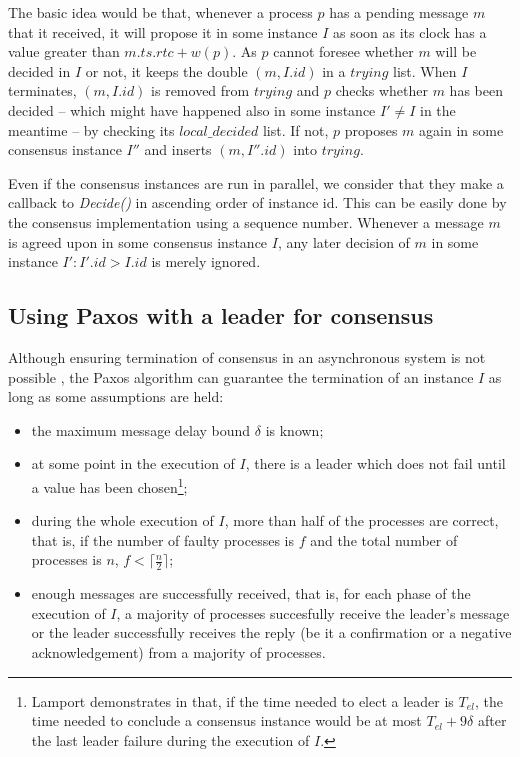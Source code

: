\documentclass[times, 10pt]{article}
\begin{document}
The basic idea would be that, whenever a process $p$ has a pending message $m$ that it received, it will propose it in some instance $I$ as soon as its clock has a value greater than $m.ts.rtc + w(p)$. As $p$ cannot foresee whether $m$ will be decided in $I$ or not, it keeps the double $(m,I.id)$ in a $trying$ list. When $I$ terminates, $(m,I.id)$ is removed from $trying$ and $p$ checks whether $m$ has been decided -- which might have happened also in some instance $I' \neq I$ in the meantime -- by checking its $local\_decided$ list. If not, $p$ proposes $m$ again in some consensus instance $I''$ and inserts $(m,I''.id)$ into $trying$.

Even if the consensus instances are run in parallel, we consider that they make a callback to \emph{Decide()} in ascending order of instance id. This can be easily done by the consensus implementation using a sequence number. Whenever a message $m$ is agreed upon in some consensus instance $I$, any later decision of $m$ in some instance \mbox{$I' : I'.id > I.id$} is merely ignored.



\subsection{Using Paxos with a leader for consensus}
\label{sec:paxos}

Although ensuring termination of consensus in an asynchronous system is not possible \cite{fischer1985idc}, the Paxos \cite{lamport1998ptp} algorithm can guarantee the termination of an instance $I$ as long as some assumptions are held:

\begin{itemize}
  \item the maximum message delay bound $\delta$ is known;
  \item at some point in the execution of $I$, there is a leader which does not fail until a value has been chosen\footnote{Lamport demonstrates in \cite{lamport1998ptp} that, if the time needed to elect a leader is $T_{el}$, the time needed to conclude a consensus instance would be at most $T_{el} + 9\delta$ after the last leader failure during the execution of $I$.};
  \item during the whole execution of $I$, more than half of the processes are correct, that is, if the number of faulty processes is $f$ and the total number of processes is $n$, $f < \lceil \frac{n}{2} \rceil$;
  \item enough messages are successfully received, that is, for each phase of the execution of $I$, a majority of processes succesfully receive the leader's message or the leader successfully receives the reply (be it a confirmation or a negative acknowledgement) from a majority of processes.
\end{itemize}
\end{document}
